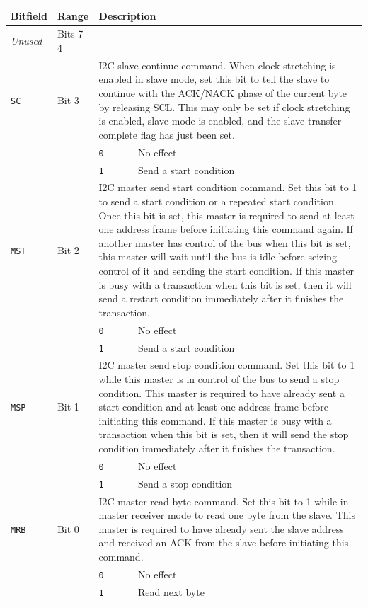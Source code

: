 \begin{tabularx}{\textwidth}{ l l l X }
\textbf{Bitfield} & \textbf{Range} & \multicolumn{2}{X}{\textbf{Description}} \\ \hline
\textit{Unused} & Bits 7-4 & \multicolumn{2}{X}{} \\
\hline
\texttt{SC} & Bit 3 & \multicolumn{2}{X}{I2C slave continue command. When clock stretching is enabled in slave mode, set this bit to tell the slave to continue with the ACK/NACK phase of the current byte by releasing SCL. This may only be set if clock stretching is enabled, slave mode is enabled, and the slave transfer complete flag has just been set.} \\
 & & \texttt{0} & No effect \\
 & & \cellcolor{tablehighlightcolor}\texttt{1} & \cellcolor{tablehighlightcolor}Send a start condition \\
\hline
\texttt{MST} & Bit 2 & \multicolumn{2}{X}{I2C master send start condition command. Set this bit to 1 to send a start condition or a repeated start condition. Once this bit is set, this master is required to send at least one address frame before initiating this command again. If another master has control of the bus when this bit is set, this master will wait until the bus is idle before seizing control of it and sending the start condition. If this master is busy with a transaction when this bit is set, then it will send a restart condition immediately after it finishes the transaction.} \\
 & & \texttt{0} & No effect \\
 & & \cellcolor{tablehighlightcolor}\texttt{1} & \cellcolor{tablehighlightcolor}Send a start condition \\
\hline
\texttt{MSP} & Bit 1 & \multicolumn{2}{X}{I2C master send stop condition command. Set this bit to 1 while this master is in control of the bus to send a stop condition. This master is required to have already sent a start condition and at least one address frame before initiating this command. If this master is busy with a transaction when this bit is set, then it will send the stop condition immediately after it finishes the transaction.} \\
 & & \texttt{0} & No effect \\
 & & \cellcolor{tablehighlightcolor}\texttt{1} & \cellcolor{tablehighlightcolor}Send a stop condition \\
\hline
\texttt{MRB} & Bit 0 & \multicolumn{2}{X}{I2C master read byte command. Set this bit to 1 while in master receiver mode to read one byte from the slave. This master is required to have already sent the slave address and received an ACK from the slave before initiating this command.} \\
 & & \texttt{0} & No effect \\
 & & \cellcolor{tablehighlightcolor}\texttt{1} & \cellcolor{tablehighlightcolor}Read next byte \\
\hline
\end{tabularx}

